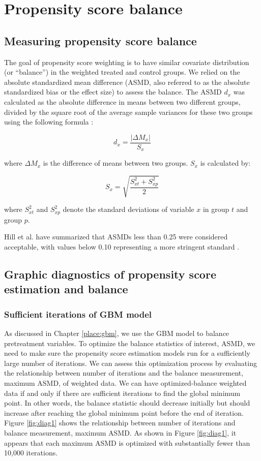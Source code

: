 \documentclass[12pt]{report}
\begin{document}
\chapter{Propensity score balance}
\label{chapter:psb}
\section{Measuring propensity score balance}
The goal of propensity score weighting is to have similar covariate distribution (or ``balance'') in the weighted treated and control groups. We relied on the absolute standardized mean difference (ASMD, also referred to as the absolute standardized bias or the effect size) to assess the balance. The ASMD $d_x$ was calculated as the absolute difference in means between two different groups, divided by the square root of the average sample variances for these two groups using the following formula \citep{haviland2007combining}:

\begin{equation*}
d_x =\frac{|\Delta M_x|}{S_x}
\end{equation*}

where $\Delta M_x$ is the difference of means between two groups. $S_x$ is calculated by: 

\begin{equation*}
S_x=\sqrt{\frac{S^2_{xt}+S^2_{xp}}{2}}
\end{equation*}

where $S^2_{xt}$ and $S^2_{xp}$ denote the standard deviations of variable $x$ in group $t$ and group $p$.

Hill et al. have summarized that ASMDs less than 0.25 were considered acceptable, with values below 0.10 representing a more stringent standard \citep{hillm2015short}.

\section{Graphic diagnostics of propensity score estimation and balance}

\subsection{Sufficient iterations of GBM model}
As discussed in Chapter \ref{place:gbm}, we use the GBM model to balance pretreatment variables. To optimize the balance statistics of interest, ASMD, we need to make sure the propensity score estimation models run for a sufficiently large number of iterations. We can assess this optimization process by evaluating the relationship between number of iterations and the balance measurement, maximum ASMD, of weighted data. We can have optimized-balance weighted data if and only if there are sufficient iterations to find the global minimum point. In other words, the balance statistic should decrease initially but should increase after reaching the global minimum point before the end of iteration. Figure \ref{fig:diag1} shows the relationship between number of iterations and balance measurement, maximum ASMD. As shown in Figure \ref{fig:diag1}, it appears that each maximum ASMD is optimized with substantially fewer than 10,000 iterations.
\end{document}
